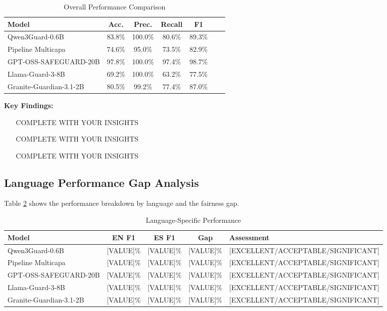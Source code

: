 \documentclass[11pt,a4paper]{article}
\begin{document}
\begin{table}[H]
\centering
\caption{Overall Performance Comparison}
\label{tab:overall}
\begin{tabular}{lcccccc}
\toprule
\textbf{Model} & \textbf{Acc.} & \textbf{Prec.} & \textbf{Recall} & \textbf{F1} \\
\midrule
Qwen3Guard-0.6B          & 83.8\% & 100.0\% & 80.6\% & 89.3\% \\
Pipeline Multicapa       & 74.6\% & 95.0\% & 73.5\% & 82.9\% \\
GPT-OSS-SAFEGUARD-20B    & 97.8\% & 100.0\% & 97.4\% & 98.7\% \\
Llama-Guard-3-8B         & 69.2\% & 100.0\% & 63.2\% & 77.5\% \\
Granite-Guardian-3.1-2B  & 80.5\% & 99.2\% & 77.4\% & 87.0\% \\
\bottomrule
\end{tabular}
\end{table}

\textbf{Key Findings:}
\begin{itemize}
    \item [COMPLETE WITH YOUR INSIGHTS]
    \item [COMPLETE WITH YOUR INSIGHTS]
    \item [COMPLETE WITH YOUR INSIGHTS]
\end{itemize}

\subsection{Language Performance Gap Analysis}

Table \ref{tab:language} shows the performance breakdown by language and the fairness gap.

\begin{table}[H]
\centering
\caption{Language-Specific Performance}
\label{tab:language}
\begin{tabular}{lcccl}
\toprule
\textbf{Model} & \textbf{EN F1} & \textbf{ES F1} & \textbf{Gap} & \textbf{Assessment} \\
\midrule
Qwen3Guard-0.6B          & [VALUE]\% & [VALUE]\% & [VALUE]\% & [EXCELLENT/ACCEPTABLE/SIGNIFICANT] \\
Pipeline Multicapa       & [VALUE]\% & [VALUE]\% & [VALUE]\% & [EXCELLENT/ACCEPTABLE/SIGNIFICANT] \\
GPT-OSS-SAFEGUARD-20B    & [VALUE]\% & [VALUE]\% & [VALUE]\% & [EXCELLENT/ACCEPTABLE/SIGNIFICANT] \\
Llama-Guard-3-8B         & [VALUE]\% & [VALUE]\% & [VALUE]\% & [EXCELLENT/ACCEPTABLE/SIGNIFICANT] \\
Granite-Guardian-3.1-2B  & [VALUE]\% & [VALUE]\% & [VALUE]\% & [EXCELLENT/ACCEPTABLE/SIGNIFICANT] \\
\bottomrule
\end{tabular}
\end{table}
\end{document}
